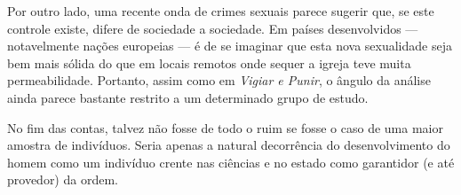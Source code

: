 \documentclass[12pt,a4paper]{article}
\begin{document}
	Por outro lado, uma recente onda de crimes sexuais parece sugerir que, 
	se este controle existe, difere de sociedade a sociedade. Em países 
	desenvolvidos --- notavelmente nações europeias --- é de se imaginar 
	que esta nova sexualidade seja bem mais sólida do que em locais remotos 
	onde sequer a igreja teve muita permeabilidade. Portanto, assim como em 
	\textit{Vigiar e Punir}, o ângulo da análise ainda parece bastante 
	restrito a um determinado grupo de estudo. 
	
	\newpage
	
	No fim das contas, talvez não fosse de todo o ruim se fosse o caso de 
	uma maior amostra de indivíduos. Seria apenas a natural decorrência 
	do desenvolvimento do homem como um indivíduo crente nas ciências e no 
	estado como garantidor (e até provedor) da ordem. 
	
	\vfill
	
	
	
\end{document}
